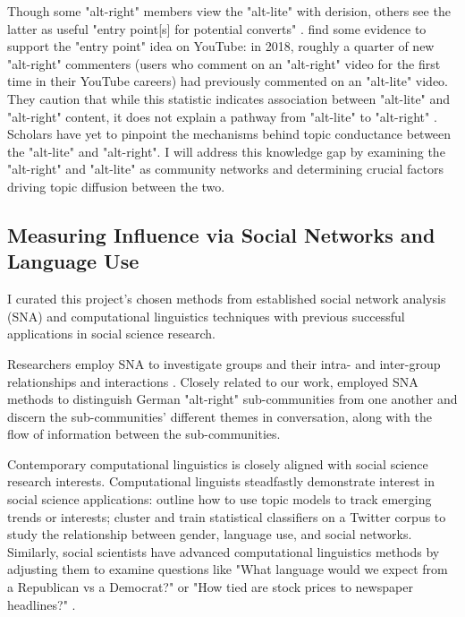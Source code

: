 \documentclass[acmlarge, screen, authorversion]{acmart}
\begin{document}
Though some "alt-right" members view the "alt-lite" with derision,
others see the latter as useful "entry point[s] for potential converts"
\cite{hartEntryistsEntryPoint2016}. \citet{ribeiroAuditingRadicalizationPathways2019} find some evidence to support
the "entry point" idea on YouTube: in 2018, roughly a
quarter of new "alt-right" commenters (users who comment on an
"alt-right" video for the first time in their YouTube careers) had
previously commented on an "alt-lite" video. They caution that while
this statistic indicates association between "alt-lite" and "alt-right" content,
it does not explain a pathway from "alt-lite" to "alt-right" 
\cite{ribeiroAuditingRadicalizationPathways2019}. Scholars have yet to pinpoint 
the mechanisms behind topic conductance between the "alt-lite" 
and "alt-right".
I will address this knowledge gap by examining the "alt-right" and "alt-lite" as
community networks and determining crucial factors driving topic
diffusion between the two.

\subsection{Measuring Influence via Social Networks and Language Use}

I curated this project's chosen methods from established social network analysis
(SNA) and computational linguistics techniques with previous successful
applications in social science research.

Researchers employ SNA to investigate groups and their intra- and inter-group
relationships and interactions \cite{carringtonModelsMethodsSocial2005}. Closely
related to our work, \citet{morstatterAltRightAltRechtsTwitter2018} employed SNA
methods to distinguish German "alt-right" sub-communities from one another and
discern the sub-communities' different themes in conversation, along with the
flow of information between the sub-communities.

Contemporary computational linguistics is closely aligned with social science
research interests. Computational linguists steadfastly demonstrate interest in
social science applications: \citep{lauOnlineTrendAnalysis} outline how to use
topic models to track emerging trends or interests;
\cite{bammanGenderIdentityLexical2014} cluster and train statistical classifiers
on a Twitter corpus to study the relationship between gender, language use, and
social networks. Similarly, social scientists have advanced computational
linguistics methods by adjusting them to examine questions like "What language
would we expect from a Republican vs a Democrat?" or "How tied are stock prices
to newspaper headlines?"  \cite{monroeFightinWordsLexical2008,
gentzkowTextData2019}.
\end{document}
